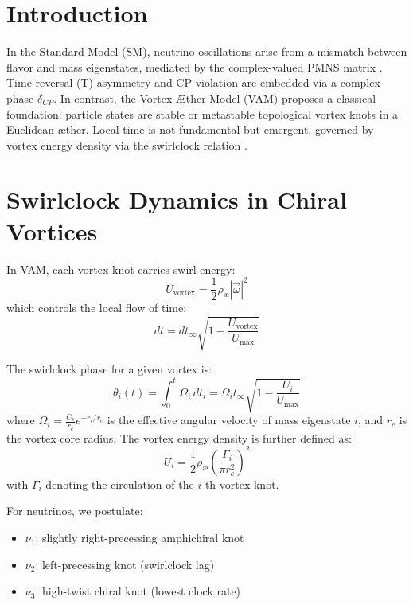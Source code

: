



\section{Introduction}

In the Standard Model (SM), neutrino oscillations arise from a mismatch between flavor and mass eigenstates, mediated by the complex-valued PMNS matrix \cite{pontecorvo1957inverse,mns1962neutrino}. Time-reversal (T) asymmetry and CP violation are embedded via a complex phase \( \delta_{CP} \). In contrast, the Vortex \AE ther Model (VAM) proposes a classical foundation: particle states are stable or metastable topological vortex knots in a Euclidean \ae ther. Local time is not fundamental but emergent, governed by vortex energy density via the swirlclock relation \cite{VAM2025}.

\section{Swirlclock Dynamics in Chiral Vortices}

In VAM, each vortex knot carries swirl energy:
\begin{equation}
U_\text{vortex} = \frac{1}{2} \rho_\text{\ae} |\vec{\omega}|^2
\end{equation}
which controls the local flow of time:
\begin{equation}
dt = dt_\infty \sqrt{1 - \frac{U_\text{vortex}}{U_\text{max}}}
\end{equation}

The swirlclock phase for a given vortex is:
\begin{equation}
\theta_i(t) = \int_0^t \Omega_i \, dt_i = \Omega_i t_\infty \sqrt{1 - \frac{U_i}{U_\text{max}}}
\end{equation}
where \( \Omega_i = \frac{C_e}{r_c} e^{-r_i/r_c} \) is the effective angular velocity of mass eigenstate \( i \), and \( r_c \) is the vortex core radius. The vortex energy density is further defined as:
\begin{equation}
U_i = \frac{1}{2} \rho_\text{\ae} \left( \frac{\Gamma_i}{\pi r_c^2} \right)^2
\end{equation}
with \( \Gamma_i \) denoting the circulation of the \( i \)-th vortex knot.

For neutrinos, we postulate:
\begin{itemize}
\item \( \nu_1 \): slightly right-precessing amphichiral knot
\item \( \nu_2 \): left-precessing knot (swirlclock lag)
\item \( \nu_3 \): high-twist chiral knot (lowest clock rate)
\end{itemize}


